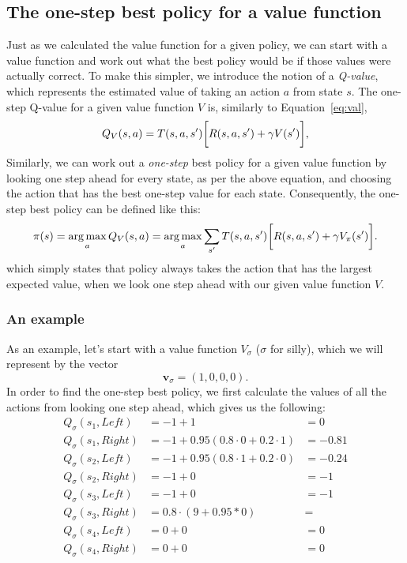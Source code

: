 \documentclass[a4paper]{article}
\begin{document}
\subsection{The one-step best policy for a value function}
Just as we calculated the value function for a given policy,
we can start with a value function and work out what the best
policy would be if those values were actually correct.
To make this simpler, we introduce the notion of a \emph{Q-value}, which
represents the estimated value of taking an action $a$ from state $s$.
The one-step Q-value for a given value function $V$ is, similarly to
Equation~\ref{eq:val},
\begin{equation}
  Q_V(s, a) = T(s, a, s') \bigg[ R(s, a, s') + \gamma V(s') \bigg] ,
\end{equation}
Similarly, we can work out a \emph{one-step} best policy for a given
value function by looking one step ahead for every state, as per the above
equation, and choosing the action that has the best one-step value for
each state.
Consequently, the one-step best policy can be defined like this:
\begin{equation} \label{eq:best_pol}
  \pi(s) = \operatorname*{arg\,max}_a Q_V(s, a) = \operatorname*{arg\,max}_a \sum_{s'} T(s, a, s') \bigg[ R(s, a, s') + \gamma V_\pi(s') \bigg] .
\end{equation}
which simply states that policy always takes the action that has the largest
expected value, when we look one step ahead with our given value function $V$.

\subsubsection{An example}
As an example, let's start with a value function $V_\sigma$ ($\sigma$ for silly), which
we will represent by the vector
\begin{equation*}
  \mathbf{v}_\sigma = (1, 0, 0, 0) .
\end{equation*}
In order to find the one-step best policy, we first calculate the values
of all the actions from looking one step ahead, which gives us the following:
\begin{align*}
  Q_\sigma(s_1, Left)  &= -1 + 1 &= 0 \\
  Q_\sigma(s_1, Right) &= -1 + 0.95 (0.8 \cdot 0 + 0.2 \cdot 1) &= -0.81 \\
  Q_\sigma(s_2, Left)  &= -1 + 0.95 (0.8 \cdot 1 + 0.2 \cdot 0) &= -0.24 \\
  Q_\sigma(s_2, Right) &= -1 + 0 &= -1 \\
  Q_\sigma(s_3, Left)  &= -1 + 0 &= -1 \\
  Q_\sigma(s_3, Right) &= 0.8 \cdot (9 + 0.95 * 0) &= \\
  Q_\sigma(s_4, Left)  &= 0 + 0 &= 0 \\
  Q_\sigma(s_4, Right) &= 0 + 0 &= 0 \\
\end{align*}
\end{document}
